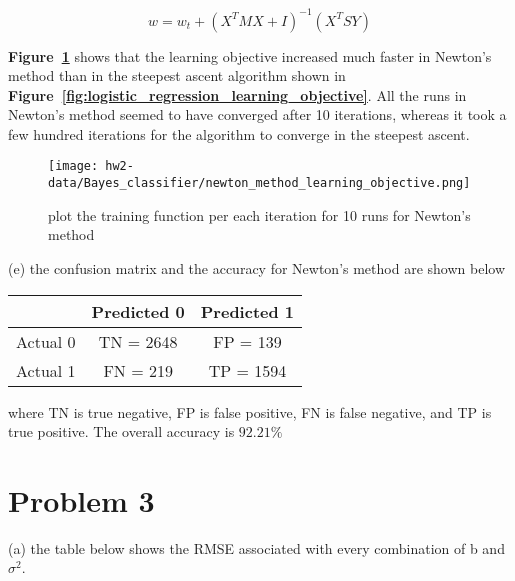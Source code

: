 \documentclass[11pt]{report}
\begin{document}
\-

\[
w =  w_{t} + (X^{T} M X + I)^{-1} (X^{T}SY)
\]

\-

\justify \textbf{Figure~\ref{fig:newton_method_learning_objective}} shows that the learning objective increased much faster in Newton's method than in the steepest ascent algorithm shown in \textbf{Figure~\ref{fig:logistic_regression_learning_objective}}. All the runs in Newton's method seemed to have converged after 10 iterations, whereas it took a few hundred iterations for the algorithm to converge in the steepest ascent. 

\begin{figure}[h]
\texttt{[image: hw2-data/Bayes\_classifier/newton\_method\_learning\_objective.png]}
\centering
\caption{plot the training function per each iteration for 10 runs for Newton's method}
\label{fig:newton_method_learning_objective}
\end{figure}

\pagebreak

\justify (e) the confusion matrix and the accuracy for Newton's method are shown below

\begin{center}
\begin{tabular}{ |c|c|c| } 
 \hline
  & Predicted 0  & Predicted 1 \\ 
 \hline
 Actual 0 & TN = 2648 & FP = 139 \\ 
  \hline
Actual 1  & FN = 219 &  TP = 1594 \\ 
 \hline
\end{tabular}
\end{center}
where TN is true negative, FP is false positive, FN is false negative, and TP is true positive. The overall accuracy is \textbf{$92.21\%$}

\pagebreak

\section* {Problem 3}

\justify (a) the table below shows the RMSE associated with every combination of b and $\sigma^{2}$. 
\end{document}
